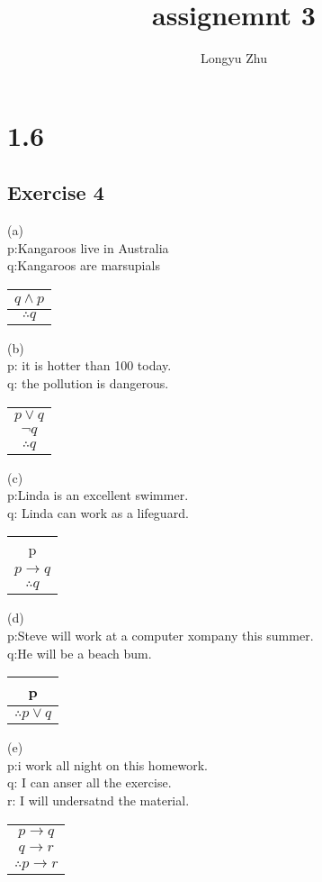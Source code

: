 \documentclass[12pt]{article}
\title{assignemnt 3}
\author{Longyu Zhu}
\begin{document}
\section*{1.6}
\subsection*{Exercise 4}
(a)\\
p:Kangaroos live in Australia\\
q:Kangaroos are marsupials\\
\begin{tabular}{c}

$q\wedge p$ \\
\hline
$\therefore q$ \\
\end{tabular}

(b)\\
p: it is hotter than 100 today.\\
q: the pollution is dangerous.\\
\begin{tabular}{c}
    $p\lor q$\\
    $\lnot q$\\
    \hline
    $\therefore q$\\
\end{tabular}


(c)\\
p:Linda is an excellent swimmer.\\
q: Linda can work as a lifeguard.\\
\begin{tabular}{c}
    p\\
    $p\rightarrow q$\\
    \hline
    $\therefore q$\\    
\end{tabular}


(d)\\
p:Steve will work at a computer xompany this summer.\\
q:He will be a beach bum.\\
\begin{tabular}{c}
    p\\
    \hline
    $\therefore p\lor q$\\
\end{tabular}

(e)\\
p:i work all night on this homework.\\
q: I can anser all the exercise.\\
r: I will undersatnd the material.\\
\begin{tabular}{c}
    $p\rightarrow q$\\
    $q\rightarrow r$\\
    \hline
    $\therefore p\rightarrow r$\\
\end{tabular}
\end{document}
